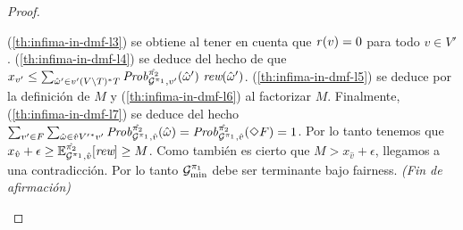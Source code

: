 \begin{proof}
\begin{proofofclaim}
    (\ref{th:infima-in-dmf-l3}) se obtiene al tener en cuenta que $\mathit{r}(v) = 0$ para todo $v \in V'$.
    (\ref{th:infima-in-dmf-l4}) se deduce del hecho de que 
    $x_{v'} \leq \sum_{\hat{\omega}' \in v' (V \setminus T)^*T}  \MDPProb{\hat{\strat{2}}}_{\StochG^{\strat{1}},v'}(\hat{\omega}')\ \Rewards(\hat{\omega}')$.
    (\ref{th:infima-in-dmf-l5}) se deduce por la definición de $M$ y
    (\ref{th:infima-in-dmf-l6}) al factorizar $M$.
    Finalmente, (\ref{th:infima-in-dmf-l7}) se deduce del hecho 
    $\sum_{v' \in F} \sum_{\hat{\omega} \in \hat{v}{V'}^*v'} \mathit{Prob}^{\hat{\pi_{2}}}_{\mathcal{G}^{\pi_{1}},\hat{v}}(\hat{\omega}) =
    \mathit{Prob}^{\hat{\pi_{2}}}_{\mathcal{G}^{\pi_{1}},\hat{v}} (\Diamond F) = 1$.
    Por lo tanto tenemos que
    $x_{\hat{v}} + \epsilon \geq \mathbb{E}^{\hat{\pi_{2}}}_{\mathcal{G}^{\pi_{1}},\hat{v}}[\textit{rew}] \geq M$.
    Como también es cierto que $M >  x_{\hat{v}} + \epsilon$, llegamos a una contradicción.
    Por lo tanto $\mathcal{G}^{\pi_{1}}_{\min}$ debe ser terminante bajo fairness.
    \hfill\emph{(Fin de afirmación)}\qedhere
  \end{proofofclaim}



\end{proof}
